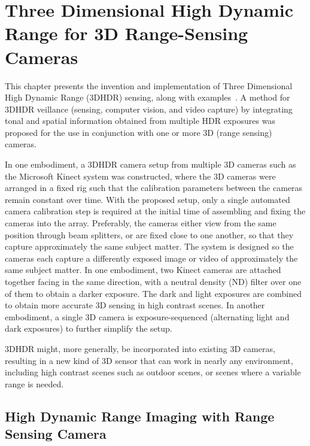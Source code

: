 \chapter{Three Dimensional High Dynamic Range for 3D Range-Sensing Cameras}
\label{3dhdr3dsensing}

This chapter presents the invention and implementation of Three Dimensional High Dynamic Range (3DHDR) sensing, along with examples~\cite{lo2013three}. A method for 3DHDR veillance (sensing, computer vision, and video capture) by integrating tonal and spatial information obtained from multiple HDR exposures was proposed for the use in conjunction with one or more 3D (range sensing) cameras.

In one embodiment, a 3DHDR camera setup from multiple 3D cameras such as the Microsoft Kinect system was constructed, where the 3D cameras were arranged in a fixed rig such that the calibration parameters between the cameras remain constant over time. With the proposed setup, only a single automated camera calibration step is required at the initial time of assembling and fixing the cameras into the array.  Preferably, the cameras either view from the same position through beam splitters, or are fixed close to one another, so that they capture approximately the same subject matter. The system is designed so the cameras each capture a differently exposed image or video of approximately the same subject matter.  In one embodiment, two Kinect cameras are attached together facing in the same direction, with a neutral density (ND) filter over one of them to obtain a darker exposure.  The dark and light exposures are combined to obtain more accurate 3D sensing in high contrast scenes.  In another embodiment, a single 3D camera is exposure-sequenced (alternating light and dark exposures) to further simplify the setup.

3DHDR might, more generally, be incorporated into existing 3D cameras, resulting in a new kind of 3D sensor that can work in nearly any environment, including high contrast scenes such as outdoor scenes, or scenes where a variable range is needed.

\section{High Dynamic Range Imaging with Range Sensing Camera}

